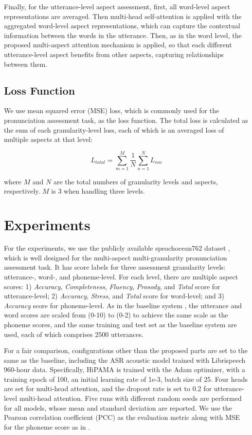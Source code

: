 \documentclass{article}
\begin{document}
Finally, for the utterance-level aspect assessment, first, all word-level aspect representations are averaged. Then multi-head self-attention is applied with the aggregated word-level aspect representations, which can capture the contextual information between the words in the utterance. Then, as in the word level, the proposed multi-aspect attention mechanism is applied, so that each different utterance-level aspect benefits from other aspects, capturing relationships between them.

\subsection{Loss Function}
We use mean squared error (MSE) loss, which is commonly used for the pronunciation assessment task, as the loss function. The total loss is calculated as the sum of each granularity-level loss, each of which is an averaged loss of multiple aspects at that level:
\begin{small}\begin{equation}
\label{eq20}
    L_{total} = \sum_{m=1}^{M}\frac{1}{N}\sum_{n=1}^{N}L_{mn}
\end{equation}\end{small}
where $M$ and $N$ are the total numbers of granularity levels and aspects, respectively. $M$ is 3 when handling three levels.

\section{Experiments}
For the experiments, we use the publicly available speachocean762 dataset \cite{zhang2021speechocean762}, which is well designed for the multi-aspect multi-granularity pronunciation assessment task. It has score labels for three assessment granularity levels: utterance-, word-, and phoneme-level. For each level, there are multiple aspect scores: 1) \textit{Accuracy}, \textit{Completeness}, \textit{Fluency}, \textit{Prosody}, and \textit{Total} score for utterance-level; 2) \textit{Accuracy}, \textit{Stress}, and \textit{Total} score for word-level; and 3) \textit{Accuracy} score for phoneme-level. As in the baseline system \cite{gong2022transformer}, the utterance and word scores are scaled from (0-10) to (0-2) to achieve the same scale as the phoneme scores, and the same training and test set as the baseline system are used, each of which comprises 2500 utterances.

For a fair comparison, configurations other than the proposed parts are set to the same as the baseline, including the ASR acoustic model trained with Librispeech \cite{panayotov2015librispeech} 960-hour data. Specifically, HiPAMA is trained with the Adam optimizer, with a training epoch of 100, an initial learning rate of 1e-3, batch size of 25. Four heads are set for multi-head attention, and the dropout rate is set to 0.2 for utterance-level multi-head attention. Five runs with different random seeds are performed for all models, whose mean and standard deviation are reported. We use the Pearson correlation coefficient (PCC) as the evaluation metric along with MSE for the phoneme score as in \cite{gong2022transformer}.
\end{document}
